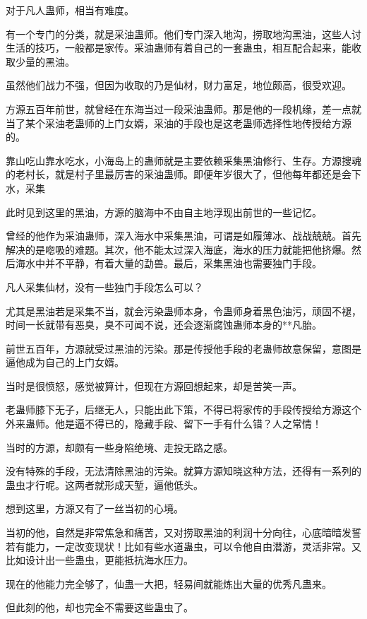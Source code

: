 \begin{this_body}
对于凡人蛊师，相当有难度。

有一个专门的分类，就是采油蛊师。他们专门深入地沟，捞取地沟黑油，这些人讨生活的技巧，一般都是家传。采油蛊师有着自己的一套蛊虫，相互配合起来，能收取少量的黑油。

虽然他们战力不强，但因为收取的乃是仙材，财力富足，地位颇高，很受欢迎。

方源五百年前世，就曾经在东海当过一段采油蛊师。那是他的一段机缘，差一点就当了某个采油老蛊师的上门女婿，采油的手段也是这老蛊师选择性地传授给方源的。

靠山吃山靠水吃水，小海岛上的蛊师就是主要依赖采集黑油修行、生存。方源搜魂的老村长，就是村子里最厉害的采油蛊师。即便年岁很大了，但他每年都还是会下水，采集

此时见到这里的黑油，方源的脑海中不由自主地浮现出前世的一些记忆。

曾经的他作为采油蛊师，深入海水中采集黑油，可谓是如履薄冰、战战兢兢。首先解决的是唿吸的难题。其次，他不能太过深入海底，海水的压力就能把他挤爆。然后海水中并不平静，有着大量的勐兽。最后，采集黑油也需要独门手段。

凡人采集仙材，没有一些独门手段怎么可以？

尤其是黑油若是采集不当，就会污染蛊师本身，令蛊师身着黑色油污，顽固不褪，时间一长就带有恶臭，臭不可闻不说，还会逐渐腐蚀蛊师本身的**凡胎。

前世五百年，方源就受过黑油的污染。那是传授他手段的老蛊师故意保留，意图是逼他成为自己的上门女婿。

当时是很愤怒，感觉被算计，但现在方源回想起来，却是苦笑一声。

老蛊师膝下无子，后继无人，只能出此下策，不得已将家传的手段传授给方源这个外来蛊师。他是逼不得已的，隐藏手段、留下一手有什么错？人之常情！

当时的方源，却颇有一些身陷绝境、走投无路之感。

没有特殊的手段，无法清除黑油的污染。就算方源知晓这种方法，还得有一系列的蛊虫才行呢。这两者就形成天堑，逼他低头。

想到这里，方源又有了一丝当初的心境。

当初的他，自然是非常焦急和痛苦，又对捞取黑油的利润十分向往，心底暗暗发誓若有能力，一定改变现状！比如有些水道蛊虫，可以令他自由潜游，灵活非常。又比如设计出一些蛊虫，更能抵抗海水压力。

现在的他能力完全够了，仙蛊一大把，轻易间就能炼出大量的优秀凡蛊来。

但此刻的他，却也完全不需要这些蛊虫了。


\end{this_body}
